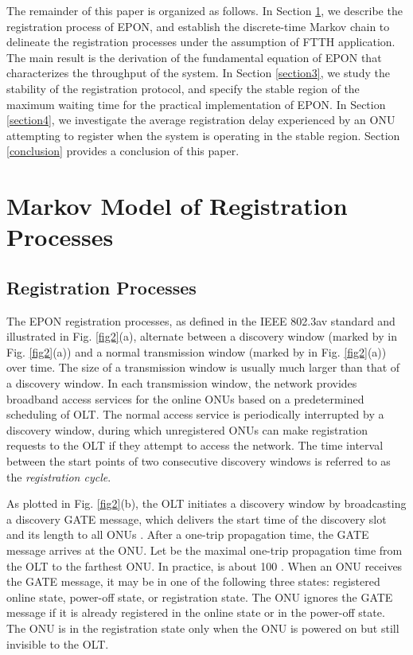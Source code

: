 \documentclass[journal]{IEEEtran}
\begin{document}
The remainder of this paper is organized as follows. In Section \ref{section2}, we describe the registration process of EPON, and establish the discrete-time Markov chain to delineate the registration processes under the assumption of FTTH application. The main result is the derivation of the fundamental equation of EPON that characterizes the throughput of the system. In Section \ref{section3}, we study the stability of the registration protocol, and specify the stable region of the maximum waiting time for the practical implementation of EPON. In Section \ref{section4}, we investigate the average registration delay experienced by an ONU attempting to register when the system is operating in the stable region. Section \ref{conclusion} provides a conclusion of this paper.

\section{Markov Model of Registration Processes}\label{section2}
\subsection{Registration Processes}\label{subsection2A}
The EPON registration processes, as defined in the IEEE 802.3av standard and illustrated in Fig. \ref{fig2}(a), alternate between a discovery window (marked by  in Fig. \ref{fig2}(a)) and a normal transmission window (marked by  in Fig. \ref{fig2}(a)) over time. The size of a transmission window is usually much larger than that of a discovery window. In each transmission window, the network provides broadband access services for the online ONUs based on a predetermined scheduling of OLT. The normal access service is periodically interrupted by a discovery window, during which unregistered ONUs can make registration requests to the OLT if they attempt to access the network. The time interval between the start points of two consecutive discovery windows is referred to as the \emph{registration cycle}.

As plotted in Fig. \ref{fig2}(b), the OLT initiates a discovery window by broadcasting a discovery GATE message, which delivers the start time of the discovery slot and its length  to all ONUs \cite{1kramer2005}. After a one-trip propagation time, the GATE message arrives at the ONU. Let  be the maximal one-trip propagation time from the OLT to the farthest ONU. In practice,  is about 100  \cite{9cui2012throughput,10Bjelica,11Bhatia}. When an ONU receives the GATE message, it may be in one of the following three states: registered online state, power-off state, or registration state. The ONU ignores the GATE message if it is already registered in the online state or in the power-off state. The ONU is in the registration state only when the ONU is powered on but still invisible to the OLT.
\end{document}
